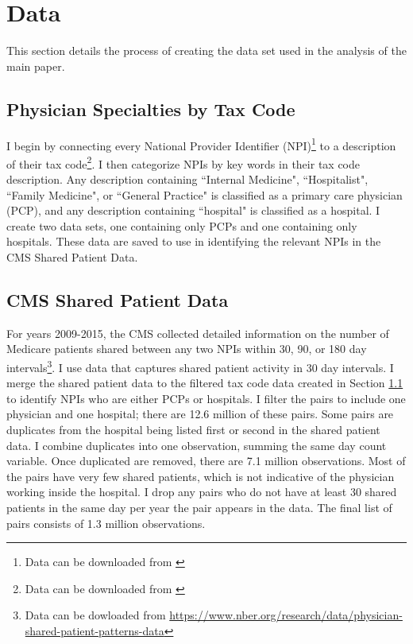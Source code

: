 \documentclass[11pt]{article}
\begin{document}
\clearpage


\appendix

\section{Data}\label{app:data}

This section details the process of creating the data set used in the analysis of the main paper. 

\subsection{Physician Specialties by Tax Code}\label{sec:taxcode}

I begin by connecting every National Provider Identifier (NPI)\footnote{Data can be downloaded from \hyperlink{https://download.cms.gov/nppes/NPI/Files.html}{}} to a description of their tax code\footnote{Data can be downloaded from \hyperlink{https://nucc.org/index.php/code-sets-mainmenu-41/provider-taxonomy-mainmenu-40/pdf-mainmenu-53}{}}. I then categorize NPIs by key words in their tax code description. Any description containing ``Internal Medicine", ``Hospitalist", ``Family Medicine", or ``General Practice" is classified as a primary care physician (PCP), and any description containing ``hospital" is classified as a hospital. I create two data sets, one containing only PCPs and one containing only hospitals. These data are saved to use in identifying the relevant NPIs in the CMS Shared Patient Data. 



\subsection{CMS Shared Patient Data}\label{sec:sharedpat}

For years 2009-2015, the CMS collected detailed information on the number of Medicare patients shared between any two NPIs within 30, 90, or 180 day intervals\footnote{Data can be dowloaded from \hyperlink{https://www.nber.org/research/data/physician-shared-patient-patterns-data}{https://www.nber.org/research/data/physician-shared-patient-patterns-data}}. I use data that captures shared patient activity in 30 day intervals. I merge the shared patient data to the filtered tax code data created in Section \ref{sec:taxcode} to identify NPIs who are either PCPs or hospitals. I filter the pairs to include one physician and one hospital; there are 12.6 million of these pairs. Some pairs are duplicates from the hospital being listed first or second in the shared patient data. I combine duplicates into one observation, summing the same day count variable. Once duplicated are removed, there are 7.1 million observations. Most of the pairs have very few shared patients, which is not indicative of the physician working inside the hospital. I drop any pairs who do not have at least 30 shared patients in the same day per year the pair appears in the data. The final list of pairs consists of 1.3 million observations. 
\end{document}

